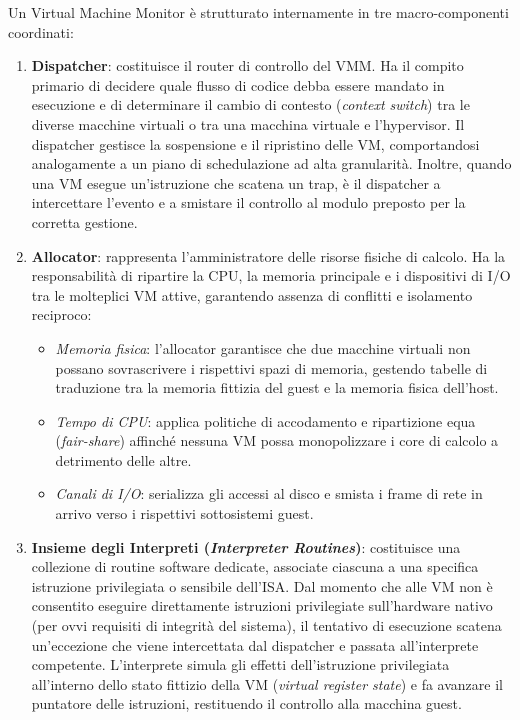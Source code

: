 \documentclass[11pt, a4paper]{article}
\begin{document}
Un Virtual Machine Monitor è strutturato internamente in tre macro-componenti coordinati:
\begin{enumerate}
    \item \textbf{Dispatcher}: costituisce il router di controllo del VMM. Ha il compito primario di decidere quale flusso di codice debba essere mandato in esecuzione e di determinare il cambio di contesto (\emph{context switch}) tra le diverse macchine virtuali o tra una macchina virtuale e l'hypervisor. Il dispatcher gestisce la sospensione e il ripristino delle VM, comportandosi analogamente a un piano di schedulazione ad alta granularità. Inoltre, quando una VM esegue un'istruzione che scatena un trap, è il dispatcher a intercettare l'evento e a smistare il controllo al modulo preposto per la corretta gestione.
    \item \textbf{Allocator}: rappresenta l'amministratore delle risorse fisiche di calcolo. Ha la responsabilità di ripartire la CPU, la memoria principale e i dispositivi di I/O tra le molteplici VM attive, garantendo assenza di conflitti e isolamento reciproco:
    \begin{itemize}
        \item \emph{Memoria fisica}: l'allocator garantisce che due macchine virtuali non possano sovrascrivere i rispettivi spazi di memoria, gestendo tabelle di traduzione tra la memoria fittizia del guest e la memoria fisica dell'host.
        \item \emph{Tempo di CPU}: applica politiche di accodamento e ripartizione equa (\emph{fair-share}) affinché nessuna VM possa monopolizzare i core di calcolo a detrimento delle altre.
        \item \emph{Canali di I/O}: serializza gli accessi al disco e smista i frame di rete in arrivo verso i rispettivi sottosistemi guest.
    \end{itemize}
    \item \textbf{Insieme degli Interpreti (\emph{Interpreter Routines})}: costituisce una collezione di routine software dedicate, associate ciascuna a una specifica istruzione privilegiata o sensibile dell'ISA. Dal momento che alle VM non è consentito eseguire direttamente istruzioni privilegiate sull'hardware nativo (per ovvi requisiti di integrità del sistema), il tentativo di esecuzione scatena un'eccezione che viene intercettata dal dispatcher e passata all'interprete competente. L'interprete simula gli effetti dell'istruzione privilegiata all'interno dello stato fittizio della VM (\emph{virtual register state}) e fa avanzare il puntatore delle istruzioni, restituendo il controllo alla macchina guest.
\end{enumerate}
\end{document}
